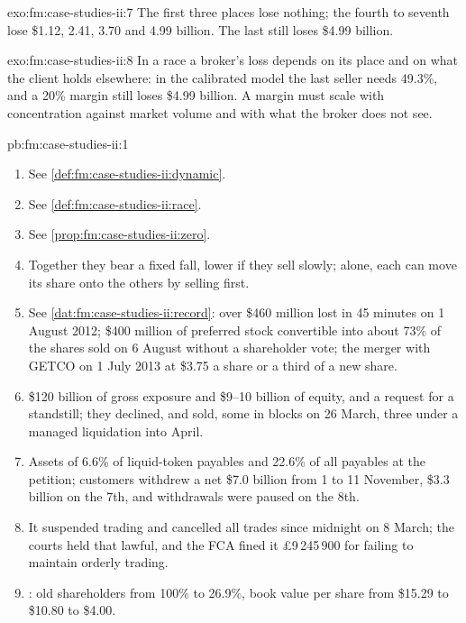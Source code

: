 \begin{solution}{exo:fm:case-studies-ii:7}
The first three places lose nothing; the fourth to seventh lose \$1.12, 2.41, 3.70 and 4.99 billion. The last still loses \$4.99 billion.
\end{solution}

\begin{solution}{exo:fm:case-studies-ii:8}
In a race a broker's loss depends on its place and on what the client holds elsewhere: in the calibrated model the last seller needs 49.3\%, and a
20\% margin still loses \$4.99 billion. A margin must scale with concentration against market volume and with what the broker does not see.
\end{solution}

\begin{solution}{pb:fm:case-studies-ii:1}
\begin{enumerate}
\item See \cref{def:fm:case-studies-ii:dynamic}.
\item See \cref{def:fm:case-studies-ii:race}.
\item See \cref{prop:fm:case-studies-ii:zero}.
\item Together they bear a fixed fall, lower if they sell slowly; alone, each can move its share onto the others by selling first.
\item See \cref{dat:fm:case-studies-ii:record}: over \$460 million lost in 45 minutes on 1 August 2012; \$400 million of preferred stock convertible
into about 73\% of the shares sold on 6 August without a shareholder vote; the merger with GETCO on 1 July 2013 at \$3.75 a share or a third of a
new share.
\item \$120 billion of gross exposure and \$9--10 billion of equity, and a request for a standstill; they declined, and sold, some in blocks on 26
March, three under a managed liquidation into April.
\item Assets of 6.6\% of liquid-token payables and 22.6\% of all payables at the petition; customers withdrew a net \$7.0 billion from 1 to 11
November, \$3.3 billion on the 7th, and withdrawals were paused on the 8th.
\item It suspended trading and cancelled all trades since midnight on 8 March; the courts held that lawful, and the FCA fined it
\pounds9\,245\,900 for failing to maintain orderly trading.
\item {}: old shareholders from 100\% to 26.9\%, book value per share from \$15.29 to \$10.80 to \$4.00.

\end{enumerate}
\end{solution}
